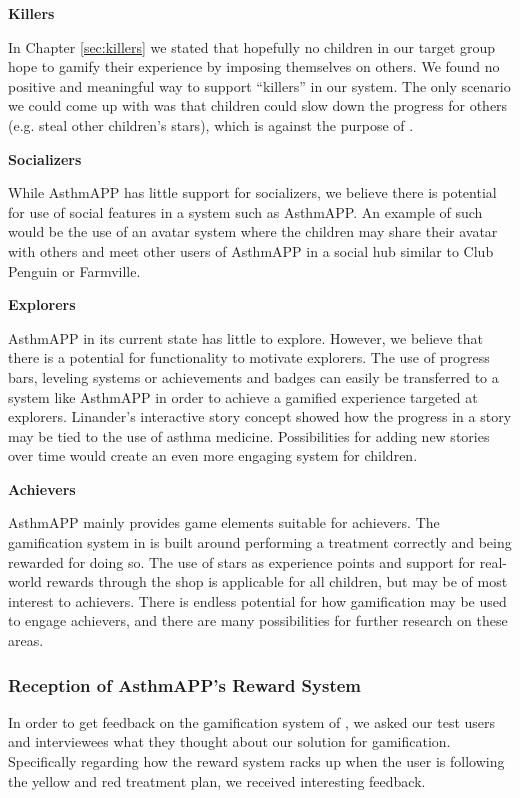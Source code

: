 \textbf{Killers}

In Chapter \ref{sec:killers} we stated that hopefully no children in our target group hope to gamify their experience by imposing themselves on others. We found no positive and meaningful way to support ``killers'' in our system. The only scenario we could come up with was that children could slow down the progress for others (e.g. steal other children's stars), which is against the purpose of \app{}.  

\textbf{Socializers}

While AsthmAPP has little support for socializers, we believe there is potential for use of social features in a system such as AsthmAPP. An example of such would be the use of an avatar system where the children may share their avatar with others and meet other users of AsthmAPP in a social hub similar to Club Penguin or Farmville. 


\textbf{Explorers}

AsthmAPP in its current state has little to explore. However, we believe that there is a potential for functionality to motivate explorers. The use of progress bars, leveling systems or achievements and badges can easily be transferred to a system like AsthmAPP in order to achieve a gamified experience targeted at explorers. Linander's interactive story concept showed how the progress in a story may be tied to the use of asthma medicine\cite{linander2013utvikling}. Possibilities for adding new stories over time would create an even more engaging system for children. 

\textbf{Achievers}

AsthmAPP mainly provides game elements suitable for achievers. The gamification system in \app{} is built around performing a treatment correctly and being rewarded for doing so. The use of stars as experience points and support for real-world rewards through the shop is applicable for all children, but may be of most interest to achievers. There is endless potential for how gamification may be used to engage achievers, and there are many possibilities for further research on these areas. 


\subsubsection{Reception of AsthmAPP's Reward System}
\label{sec:receptionofrewardsystem}
In order to get feedback on the gamification system of \app{}, we asked our test users and interviewees what they thought about our solution for gamification. Specifically regarding how the reward system racks up when the user is following the yellow and red treatment plan, we received interesting feedback.

